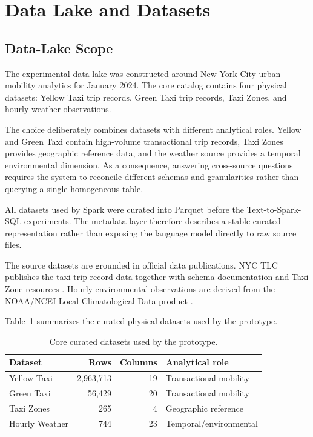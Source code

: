 \section{Data Lake and Datasets}
\label{sec:data-lake}

\subsection{Data-Lake Scope}

The experimental data lake was constructed around New York City
urban-mobility analytics for January 2024. The core catalog contains four
physical datasets: Yellow Taxi trip records, Green Taxi trip records, Taxi
Zones, and hourly weather observations.

The choice deliberately combines datasets with different analytical roles.
Yellow and Green Taxi contain high-volume transactional trip records, Taxi
Zones provides geographic reference data, and the weather source provides a
temporal environmental dimension. As a consequence, answering cross-source
questions requires the system to reconcile different schemas and
granularities rather than querying a single homogeneous table.

All datasets used by Spark were curated into Parquet before the
Text-to-Spark-SQL experiments. The metadata layer therefore describes a
stable curated representation rather than exposing the language model
directly to raw source files.



The source datasets are grounded in official data publications. NYC TLC
publishes the taxi trip-record data together with schema documentation and
Taxi Zone resources \cite{nyctlcTripData,nyctlcTripGuide}. Hourly
environmental observations are derived from the NOAA/NCEI Local
Climatological Data product \cite{noaaLCD}.

Table~\ref{tab:core-datasets} summarizes the curated physical datasets used by
the prototype.

\begin{table}[htbp]
\centering
\caption{Core curated datasets used by the prototype.}
\label{tab:core-datasets}
\begin{tabular}{lrrl}
\toprule
Dataset & Rows & Columns & Analytical role \\
\midrule
Yellow Taxi & 2,963,713 & 19 & Transactional mobility \\
Green Taxi & 56,429 & 20 & Transactional mobility \\
Taxi Zones & 265 & 4 & Geographic reference \\
Hourly Weather & 744 & 23 & Temporal/environmental \\
\bottomrule
\end{tabular}
\end{table}

